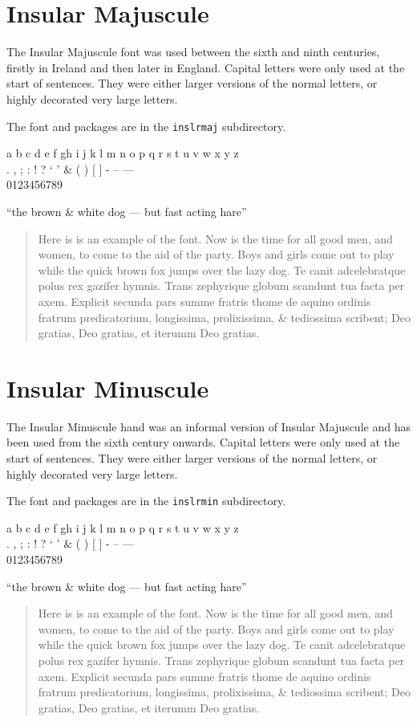 \documentclass{article}
\newcommand{\abc}{a b c d e f gh i j k l m n o p q r s t u v w x y z}
\newcommand{\punct}{. , ; : ! ? ` ' \& ( ) [ ]}
\newcommand{\figs}{0123456789}
\newcommand{\dashes}{- -- ---}
\newcommand{\ligs}{``the brown \& white dog --- but fast acting hare''}
\newcommand{\sentence}{%
    now is the time for all good
men, and women, to come to the aid of the party while the quick brown fox
jumps over the lazy dog.}
\newcommand{\latin}{%
    Te canit adcelebratque polus rex gazifer hymnis.
Trans zephyrique globum scandunt tua facta per axem.
Explicit secunda pars summe fratris thome de aquino
ordinis fratrum predicatorium, longissima, prolixissima,
\& tediossima scribent; Deo gratias, Deo gratias, et iterumm
Deo gratias.
}
\renewcommand{\sentence}{%
Here is is an example of the font. Now is the time for all good
men, and women, to come to the aid of the party. Boys and girls come
out to play while the quick brown fox jumps over the lazy dog.}
\begin{document}
\clearpage
\section{Insular Majuscule}

    The Insular Majuscule font was used between the sixth and ninth centuries,
firstly in Ireland and then later in England.
Capital letters were only used at the start of sentences. 
They were either larger versions of the normal letters, or highly decorated
very large letters.


    The font and packages are in the \texttt{inslrmaj} subdirectory.

\begin{center}
\imajfamily
\abc \\
\punct{} \dashes \\
\figs 

\ligs\par
\end{center}

\begin{quotation}
\renewcommand{\baselinestretch}{1.5}
\imajfamily
\sentence{} \latin \par
\end{quotation}


\clearpage
\section{Insular Minuscule}

    The Insular Minuscule hand was an informal version of Insular Majuscule and has been
used from the sixth century onwards. 
Capital letters were only used at the start of sentences. 
They were either larger versions of the normal letters, or highly decorated
very large letters.


    The font and packages are in the \texttt{inslrmin} subdirectory.

\begin{center}
\iminfamily
\abc \\
\punct{} \dashes \\
\figs 

\ligs\par
\end{center}

\begin{quotation}
\renewcommand{\baselinestretch}{1.5}
\iminfamily
\sentence{} \latin \par
\end{quotation}
\end{document}
